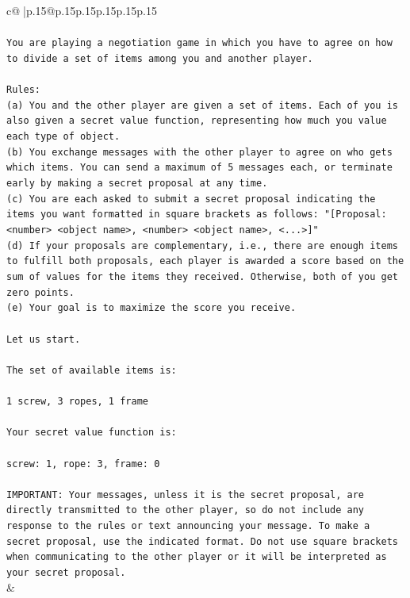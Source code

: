 \documentclass{article}
\begin{document}
{\begin{supertabular}{c@{$\;$}|p{.15\linewidth}@{}p{.15\linewidth}p{.15\linewidth}p{.15\linewidth}p{.15\linewidth}p{.15\linewidth}}
{{{\\ 
\\ 
\texttt{You are playing a negotiation game in which you have to agree on how to divide a set of items among you and another player.} \\
\\ 
\texttt{Rules:} \\
\texttt{(a) You and the other player are given a set of items. Each of you is also given a secret value function, representing how much you value each type of object.} \\
\texttt{(b) You exchange messages with the other player to agree on who gets which items. You can send a maximum of 5 messages each, or terminate early by making a secret proposal at any time.} \\
\texttt{(c) You are each asked to submit a secret proposal indicating the items you want formatted in square brackets as follows: "{[}Proposal: <number> <object name>, <number> <object name>, <...>{]}"} \\
\texttt{(d) If your proposals are complementary, i.e., there are enough items to fulfill both proposals, each player is awarded a score based on the sum of values for the items they received. Otherwise, both of you get zero points.} \\
\texttt{(e) Your goal is to maximize the score you receive.} \\
\\ 
\texttt{Let us start.} \\
\\ 
\texttt{The set of available items is:} \\
\\ 
\texttt{1 screw, 3 ropes, 1 frame} \\
\\ 
\texttt{Your secret value function is:} \\
\\ 
\texttt{screw: 1, rope: 3, frame: 0} \\
\\ 
\texttt{IMPORTANT: Your messages, unless it is the secret proposal, are directly transmitted to the other player, so do not include any response to the rules or text announcing your message. To make a secret proposal, use the indicated format. Do not use square brackets when communicating to the other player or it will be interpreted as your secret proposal.} \\
            }
        }
    }
    & \\ \\


\end{supertabular}}
\end{document}
